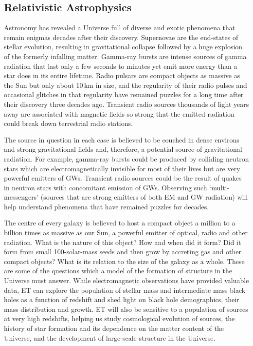 \FloatBarrier
\subsection{Relativistic Astrophysics}
Astronomy has revealed a Universe full of diverse and exotic phenomena that remain enigmas decades after their discovery.
Supernovae are the end-states of stellar evolution, resulting in gravitational collapse followed by a huge explosion of the formerly infalling matter.
Gamma-ray bursts are intense sources of gamma radiation that last only a few seconds to minutes yet emit more energy than a star does in its entire lifetime.
Radio pulsars are compact objects as massive as the Sun but only about 10\,km in size, and the regularity of their radio pulses and occasional glitches in that regularity have remained  puzzles for a long time after their discovery three decades ago.
Transient radio sources thousands of light years away are associated with magnetic fields so strong that the emitted radiation could break down terrestrial radio stations.

The source in question in each case is believed to be couched in dense environs and strong gravitational fields and, therefore, a potential source of gravitational radiation. For example, gamma-ray bursts could be produced by colliding neutron stars which are electromagnetically invisible for most of their lives but are very powerful emitters of GWs. Transient radio sources could be the result of quakes in neutron stars with concomitant emission of GWs.
Observing such `multi-messengers' (sources that are strong emitters of both EM and GW radiation) will help understand phenomena that have remained puzzles for decades.

The centre of every galaxy is believed to host a compact object a million to a billion times as massive as our Sun, a powerful emitter of optical, radio and other radiation.
What is the nature of this object? How and when did it form?
Did it form from small 100-solar-mass seeds and then grow by accreting gas and other compact objects? What is its relation to the size of the galaxy as a whole.
These are some of the questions which a model of the formation of structure in the Universe must answer.  
While electromagnetic observations  have provided valuable data, ET can explore the population of stellar mass and intermediate mass black holes as a function  of redshift and shed light on black hole demographics, their 
mass distribution and growth.
ET will also be sensitive to a population of sources at very high redshifts, helping us study cosmological evolution of sources, the history of star formation and its dependence on the matter content of the Universe, and the development of large-scale structure in the Universe. 
\FloatBarrier
